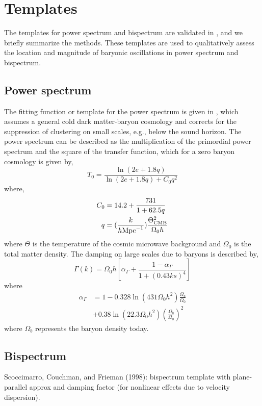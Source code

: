 \section{Templates}\label{sec:templates}
The templates for power spectrum and bispectrum are validated in \cite{behera2013}, and we briefly summarize the methods. These templates are used to qualitatively assess the location and magnitude of baryonic oscillations in power spectrum and bispectrum.

\subsection{Power spectrum}
The fitting function or template for the power spectrum is given in \citep{1998ApJ...496..605E}, which assumes a general cold dark matter-baryon cosmology and corrects for the suppression of clustering on small scales, e.g., below the sound horizon. The power spectrum can be described as the multiplication of the primordial power spectrum and the square of the transfer function, which for a zero baryon cosmology is given by,
\begin{equation}
    T_{0} = \frac{\ln(2e+1.8q)}{\ln(2e+1.8q) + C_{0} q^{2}}
\end{equation}
where,
\begin{align}
    C_{0} &= 14.2 + \frac{731}{1 + 62.5q}\\
    q &= (\frac{k}{h{\rm Mpc}^{-1}})\frac{\Theta^{2}_{\rm CMB}}{\Omega_{0}h}
\end{align}
where $\Theta$ is the temperature of the cosmic microwave background and $\Omega_{0}$ is the total matter density. The damping on large scales due to baryons is described by,
\begin{equation}
    \Gamma(k) = \Omega_{0}h[\alpha_{\Gamma} + \frac{1-\alpha_{\Gamma}}{1 + (0.43ks)^{4}}] 
\end{equation}
where
\begin{align}
    \alpha_{\Gamma} &=1-0.328\ln(431\Omega_{0}h^{2})\frac{\Omega_{b}}{\Omega_{0}}\nonumber\\
    &+ 0.38\ln(22.3\Omega_{0}h^{2}) (\frac{\Omega_{b}}{\Omega_{0}})^{2}
\end{align}
where $\Omega_{b}$ represents the baryon density today. 


\subsection{Bispectrum}
Scoccimarro, Couchman, and Frieman (1998): bispectrum template with plane-parallel approx and damping factor (for nonlinear effects due to velocity dispersion).
